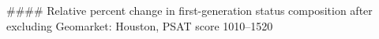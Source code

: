 #### Relative percent change in first-generation status composition after excluding Geomarket: Houston, PSAT score 1010–1520
